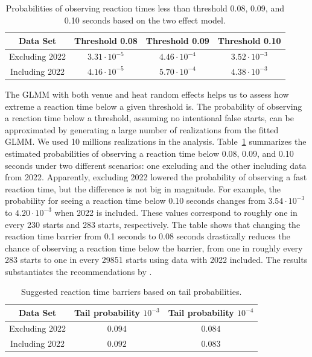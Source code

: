 \documentclass[12pt, letterpaper]{article}
\begin{document}
\begin{table}
  \centering
  \caption{Probabilities of observing reaction times less than threshold 0.08,
  0.09, and 0.10 seconds based on the two effect model.}
  \begin{tabular}{c c c c} 
   \toprule
   Data Set & Threshold 0.08 & Threshold 0.09 & Threshold 0.10  \\ 
   \midrule
   Excluding 2022 & $3.31\cdot10^{-5}$ & $4.46\cdot10^{-4}$ &  $3.52\cdot10^{-3}$  \\ 
   Including 2022 & $4.16\cdot10^{-5}$ & $5.70\cdot10^{-4}$ & $4.38\cdot10^{-3}$ \\
   \bottomrule
  \end{tabular}
  \label{tab:Sim_probability}
\end{table}

The GLMM with both venue and heat random effects helps us to assess how extreme
a reaction time below a given threshold is. The probability of observing a reaction
time below a threshold, assuming no intentional false starts, can be
approximated by generating a large number of realizations from the fitted
GLMM. We used 10 millions realizations in the analysis. 
Table~\ref{tab:Sim_probability} summarizes the estimated probabilities of
observing a reaction time below 0.08, 0.09, and 0.10 seconds under two different
scenarios: one excluding and the other including data from 2022. Apparently,
excluding 2022 lowered the probability of observing a fast reaction time, but
the difference is not big in magnitude. For example, the probability for
seeing a reaction time below 0.10 seconds changes from $3.54\cdot 10^{-3}$ to
$4.20\cdot 10^{-3}$ when 2022 is included. These values correspond to roughly one in
every 230 starts and 283 starts, respectively. The table shows that changing the
reaction time barrier from 0.1 seconds to 0.08 seconds drastically reduces the
chance of observing a reaction time below the barrier, from one in roughly every
283 starts to one in every 29851 starts using data with 2022 included. The
results substantiates the recommendations by \citet{komi2009iaaf}.


\begin{table}
  \centering
  \caption{Suggested reaction time barriers based on tail probabilities.}
  \begin{tabular}{c c c} 
   \toprule
   Data Set & Tail probability  $10^{-3}$ & Tail probability $10^{-4}$ \\ 
   \midrule
   Excluding 2022 & $0.094$ & $0.084$ \\ 
   Including 2022 & $0.092$ & $0.083$ \\
   \bottomrule
  \end{tabular}
  \label{tab:Sim_time}
\end{table}
\end{document}
